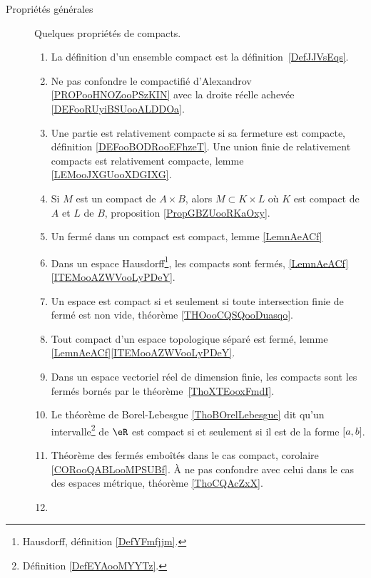         \label{THEMEooQQBHooLcqoKB}
\begin{description}

	\item[Propriétés générales]

		Quelques propriétés de compacts.

		\begin{enumerate}
			\item
			      La définition d'un ensemble compact est la définition~\ref{DefJJVsEqs}.
			\item
			      Ne pas confondre le compactifié d'Alexandrov \ref{PROPooHNOZooPSzKIN} avec la droite réelle achevée \ref{DEFooRUyiBSUooALDDOa}.
			\item
			      Une partie est relativement compacte si sa fermeture est compacte, définition \ref{DEFooBODRooEFhzeT}. Une union finie de relativement compacts est relativement compacte, lemme \ref{LEMooJXGUooXDGIXG}.
			\item
			      Si \( M\) est un compact de \( A\times B\), alors \( M\subset K\times L\) où \( K\) est compact de \( A\) et \( L\) de \( B\), proposition \ref{PropGBZUooRKaOxy}.
			\item
			      Un fermé dans un compact est compact, lemme \ref{LemnAeACf}
			\item
			      Dans un espace Hausdorff\footnote{Hausdorff, définition \ref{DefYFmfjjm}.}, les compacts sont fermés, \ref{LemnAeACf}\ref{ITEMooAZWVooLyPDeY}.
			\item
			      Un espace est compact si et seulement si toute intersection finie de fermé est non vide, théorème \ref{THOooCQSQooDuasqo}.
			\item
			      Tout compact d'un espace topologique séparé est fermé, lemme \ref{LemnAeACf}\ref{ITEMooAZWVooLyPDeY}.
			\item
			      Dans un espace vectoriel réel de dimension finie, les compacts sont les fermés bornés par le théorème~\ref{ThoXTEooxFmdI}.
			\item
			      Le théorème de Borel-Lebesgue \ref{ThoBOrelLebesgue} dit qu'un intervalle\footnote{Définition \ref{DefEYAooMYYTz}.} de \( \eR\) est compact si et seulement si il est de la forme \( \mathopen[ a , b \mathclose]\).
			\item
			      Théorème des fermés emboîtés dans le cas compact, corolaire \ref{CORooQABLooMPSUBf}. À ne pas confondre avec celui dans le cas des espaces métrique, théorème \ref{ThoCQAcZxX}.
			\item

\end{enumerate}
\end{description}
